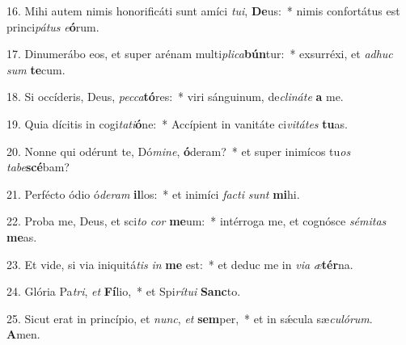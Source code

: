 16. Mihi autem nimis honorificáti sunt amíci \textit{tu}\textit{i}, \textbf{De}us:~*  nimis confortátus est princi\textit{pá}\textit{tus} \textit{e}\textbf{ó}rum.\

17. Dinumerábo eos, et super arénam multi\textit{pli}\textit{ca}\textbf{bún}tur:~*  exsurréxi, et \textit{ad}\textit{huc} \textit{sum} \textbf{te}cum.\

18. Si occíderis, Deus, \textit{pec}\textit{ca}\textbf{tó}res:~*  viri sánguinum, de\textit{cli}\textit{ná}\textit{te} \textbf{a} me.\

19. Quia dícitis in cogi\textit{ta}\textit{ti}\textbf{ó}ne:~*  Accípient in vanitáte ci\textit{vi}\textit{tá}\textit{tes} \textbf{tu}as.\

20. Nonne qui odérunt te, Dó\textit{mi}\textit{ne}, \textbf{ó}deram?~*  et super inimícos tu\textit{os} \textit{ta}\textit{be}\textbf{scé}bam?\

21. Perfécto ódio ó\textit{de}\textit{ram} \textbf{il}los:~*  et inimíci \textit{fac}\textit{ti} \textit{sunt} \textbf{mi}hi.\

22. Proba me, Deus, et sci\textit{to} \textit{cor} \textbf{me}um:~*  intérroga me, et cognósce \textit{sé}\textit{mi}\textit{tas} \textbf{me}as.\

23. Et vide, si via iniquitá\textit{tis} \textit{in} \textbf{me} est:~*  et deduc me in \textit{vi}\textit{a} \textit{æ}\textbf{tér}na.\

24. Glória Pa\textit{tri}, \textit{et} \textbf{Fí}lio,~*  et Spi\textit{rí}\textit{tu}\textit{i} \textbf{Sanc}to.\

25. Sicut erat in princípio, et \textit{nunc}, \textit{et} \textbf{sem}per,~*  et in sǽcula sæ\textit{cu}\textit{ló}\textit{rum}. \textbf{A}men.\

